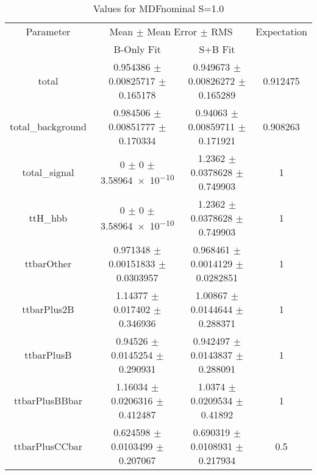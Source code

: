 \begin{table}
\centering
\caption{Values for MDFnominal S=1.0}
\begin{tabular}{cccc}
\toprule
Parameter & \multicolumn{2}{c}{Mean $\pm$ Mean Error $\pm$ RMS} & Expectation\\
 & B-Only Fit & S+B Fit & \\
\midrule
total & \num{0.954386} $\pm$ \num{0.00825717} $\pm$ \num{0.165178} & \num{0.949673} $\pm$ \num{0.00826272} $\pm$ \num{0.165289} & \num{0.912475}\\
total\_background & \num{0.984506} $\pm$ \num{0.00851777} $\pm$ \num{0.170334} & \num{0.94063} $\pm$ \num{0.00859711} $\pm$ \num{0.171921} & \num{0.908263}\\
total\_signal & \num{0} $\pm$ \num{0} $\pm$ \num{3.58964e-10} & \num{1.2362} $\pm$ \num{0.0378628} $\pm$ \num{0.749903} & \num{1}\\
ttH\_hbb & \num{0} $\pm$ \num{0} $\pm$ \num{3.58964e-10} & \num{1.2362} $\pm$ \num{0.0378628} $\pm$ \num{0.749903} & \num{1}\\
ttbarOther & \num{0.971348} $\pm$ \num{0.00151833} $\pm$ \num{0.0303957} & \num{0.968461} $\pm$ \num{0.0014129} $\pm$ \num{0.0282851} & \num{1}\\
ttbarPlus2B & \num{1.14377} $\pm$ \num{0.017402} $\pm$ \num{0.346936} & \num{1.00867} $\pm$ \num{0.0144644} $\pm$ \num{0.288371} & \num{1}\\
ttbarPlusB & \num{0.94526} $\pm$ \num{0.0145254} $\pm$ \num{0.290931} & \num{0.942497} $\pm$ \num{0.0143837} $\pm$ \num{0.288091} & \num{1}\\
ttbarPlusBBbar & \num{1.16034} $\pm$ \num{0.0206316} $\pm$ \num{0.412487} & \num{1.0374} $\pm$ \num{0.0209534} $\pm$ \num{0.41892} & \num{1}\\
ttbarPlusCCbar & \num{0.624598} $\pm$ \num{0.0103499} $\pm$ \num{0.207067} & \num{0.690319} $\pm$ \num{0.0108931} $\pm$ \num{0.217934} & \num{0.5}\\
\bottomrule
\end{tabular}
\end{table}